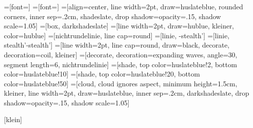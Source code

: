 =[font={\footnotesize}]
=[font={\small}]
=[align=center, line width=2pt, draw=huslateblue, rounded corners, inner
sep=.2cm, shadeslate, drop shadow={opacity=.15}, shadow scale=1.05]
=[box, darkshadeslate]
=[line width=2pt, draw=hublue, kleiner, color=hublue]
=[nichtrundelinie, line cap=round]
=[linie, -stealth']
=[linie, stealth'-stealth']
=[line width=2pt, line cap=round, draw=black, decorate,
decoration=coil, kleiner]
=[decorate, decoration={expanding waves, angle=30, segment
length=6}, nichtrundelinie]
=[shade, top color=huslateblue!2, bottom color=huslateblue!10]
=[shade, top color=huslateblue!20, bottom
color=huslateblue!50]
=[cloud, cloud ignores aspect, minimum height=1.5cm, kleiner,
line width=2pt, draw=huslateblue, inner sep=.2cm, darkshadeslate,
drop shadow={opacity=.15}, shadow scale=1.05]

[klein]
